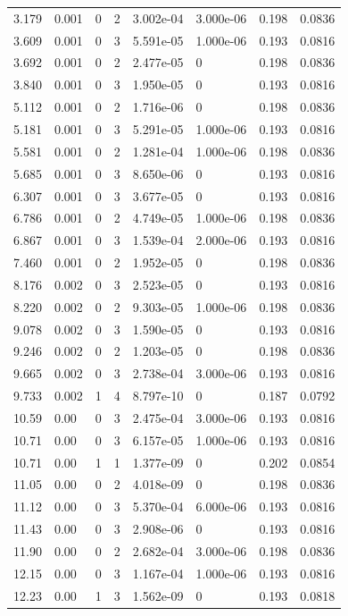 \documentclass[preview]{standalone}
\begin{document}
{{\begin{tabular}{L{1.2cm}C{1.2cm} C{0.3cm}C{0.5cm} C{1.4cm}C{1.4cm} C{1.4cm}C{1.4cm}}
  3.179  &  0.001  & 0     &  2 &  3.002e-04  & 3.000e-06  & 0.198 &  0.0836   \\ 
  3.609  &  0.001  & 0     &  3 &  5.591e-05  & 1.000e-06  & 0.193 &  0.0816   \\ 
  3.692  &  0.001  & 0     &  2 &  2.477e-05  & 0  & 0.198 &  0.0836   \\ 
  3.840  &  0.001  & 0     &  3 &  1.950e-05  & 0  & 0.193 &  0.0816   \\ 
  5.112  &  0.001  & 0     &  2 &  1.716e-06  & 0  & 0.198 &  0.0836   \\ 
  5.181  &  0.001  & 0     &  3 &  5.291e-05  & 1.000e-06  & 0.193 &  0.0816   \\ 
  5.581  &  0.001  & 0     &  2 &  1.281e-04  & 1.000e-06  & 0.198 &  0.0836   \\ 
  5.685  &  0.001  & 0     &  3 &  8.650e-06  & 0  & 0.193 &  0.0816   \\ 
  6.307  &  0.001  & 0     &  3 &  3.677e-05  & 0  & 0.193 &  0.0816   \\ 
  6.786  &  0.001  & 0     &  2 &  4.749e-05  & 1.000e-06  & 0.198 &  0.0836   \\ 
  6.867  &  0.001  & 0     &  3 &  1.539e-04  & 2.000e-06  & 0.193 &  0.0816   \\ 
  7.460  &  0.001  & 0     &  2 &  1.952e-05  & 0  & 0.198 &  0.0836   \\ 
  8.176  &  0.002  & 0     &  3 &  2.523e-05  & 0  & 0.193 &  0.0816   \\ 
  8.220  &  0.002  & 0     &  2 &  9.303e-05  & 1.000e-06  & 0.198 &  0.0836   \\ 
  9.078  &  0.002  & 0     &  3 &  1.590e-05  & 0  & 0.193 &  0.0816   \\ 
  9.246  &  0.002  & 0     &  2 &  1.203e-05  & 0  & 0.198 &  0.0836   \\ 
  9.665  &  0.002  & 0     &  3 &  2.738e-04  & 3.000e-06  & 0.193 &  0.0816   \\ 
  9.733  &  0.002  & 1     &  4 &  8.797e-10  & 0  & 0.187 &  0.0792   \\ 
  10.59  &  0.00  & 0     &  3 &  2.475e-04  & 3.000e-06  & 0.193 &  0.0816   \\ 
  10.71  &  0.00  & 0     &  3 &  6.157e-05  & 1.000e-06  & 0.193 &  0.0816   \\ 
  10.71  &  0.00  & 1     &  1 &  1.377e-09  & 0  & 0.202 &  0.0854   \\ 
  11.05  &  0.00  & 0     &  2 &  4.018e-09  & 0  & 0.198 &  0.0836   \\ 
  11.12  &  0.00  & 0     &  3 &  5.370e-04  & 6.000e-06  & 0.193 &  0.0816   \\ 
  11.43  &  0.00  & 0     &  3 &  2.908e-06  & 0  & 0.193 &  0.0816   \\ 
  11.90  &  0.00  & 0     &  2 &  2.682e-04  & 3.000e-06  & 0.198 &  0.0836   \\ 
  12.15  &  0.00  & 0     &  3 &  1.167e-04  & 1.000e-06  & 0.193 &  0.0816   \\ 
  12.23  &  0.00  & 1     &  3 &  1.562e-09  & 0  & 0.193 &  0.0818   \\ 
\hline 
\end{tabular} 

}}
\end{document}
